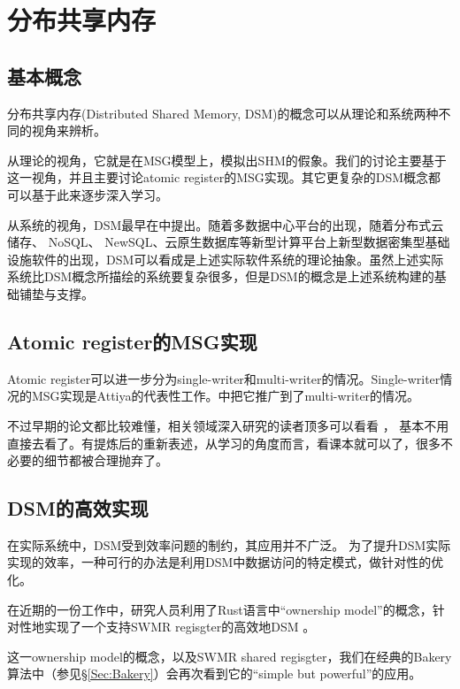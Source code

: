\documentclass[UTF8]{ctexrep}
\begin{document}
\chapter{分布共享内存}

\section{基本概念}

分布共享内存(Distributed Shared Memory, DSM)的概念可以从理论和系统两种不同的视角来辨析。

从理论的视角，它就是在MSG模型上，模拟出SHM的假象。我们的讨论主要基于这一视角，并且主要讨论atomic register的MSG实现。其它更复杂的DSM概念都可以基于此来逐步深入学习。

从系统的视角，DSM最早在\cite{Li89}中提出。随着多数据中心平台的出现，随着分布式云储存、 NoSQL、 NewSQL、云原生数据库等新型计算平台上新型数据密集型基础设施软件的出现，DSM可以看成是上述实际软件系统的理论抽象。虽然上述实际系统比DSM概念所描绘的系统要复杂很多，但是DSM的概念是上述系统构建的基础铺垫与支撑。

\section{Atomic register的MSG实现}

Atomic register可以进一步分为single-writer和multi-writer的情况。Single-writer情况的MSG实现是Attiya的代表性工作\cite{Attiya95}。\cite{Lynch97}中把它推广到了multi-writer的情况。

不过早期的论文都比较难懂，相关领域深入研究的读者顶多可以看看 \cite{Attiya95}，\cite{Lynch97} 基本不用直接去看了。\cite[Chap 16]{Aspnes19}有提炼后的重新表述，从学习的角度而言，看课本就可以了，很多不必要的细节都被合理抛弃了。

\section{DSM的高效实现}

在实际系统中，DSM受到效率问题的制约，其应用并不广泛。
为了提升DSM实际实现的效率，一种可行的办法是利用DSM中数据访问的特定模式，做针对性的优化。

在近期的一份工作中，研究人员利用了Rust语言中“ownership model”的概念，针对性地实现了一个支持SWMR regisgter的高效地DSM \cite{Ma24}。

这一ownership model的概念，以及SWMR shared regisgter，我们在经典的Bakery算法中（参见\S \ref{Sec:Bakery}）会再次看到它的“simple but powerful”的应用。
\end{document}
